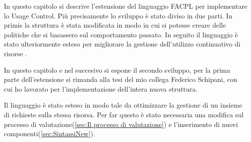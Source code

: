 \label{chap:Usage Control in FACPL}
In questo capitolo si descrive l'estensione del linguaggio \ac{FACPL} per implementare lo Usage Control.
Più precisamente lo sviluppo è stato diviso in due parti. In primis la struttura è stata modificata in modo
in cui si potesse creare delle politiche che si basassero sul comportamento passato. In seguito il linguaggio
è stato ulteriormente esteso per migliorare la gestione dell'utilizzo continuativo di risorse .\par
In questo capitolo e nel succesivo si espone il secondo sviluppo, per la prima parte dell'estensione si rimanda
alla tesi del mio collega Federico Schipani, con cui ho lavorato per l'implementazione dell'intera nuova struttura. \par
Il linguaggio è stato esteso in modo tale da ottimizzare la gestione di un insieme di richieste sulla stessa risorsa.
Per far questo è stato necessaria una modifica sul processo di valutazione(\ref{sec:Il processo di valutazione})
e l'inserimento di nuovi componenti(\ref{sec:SintassiNew}).
